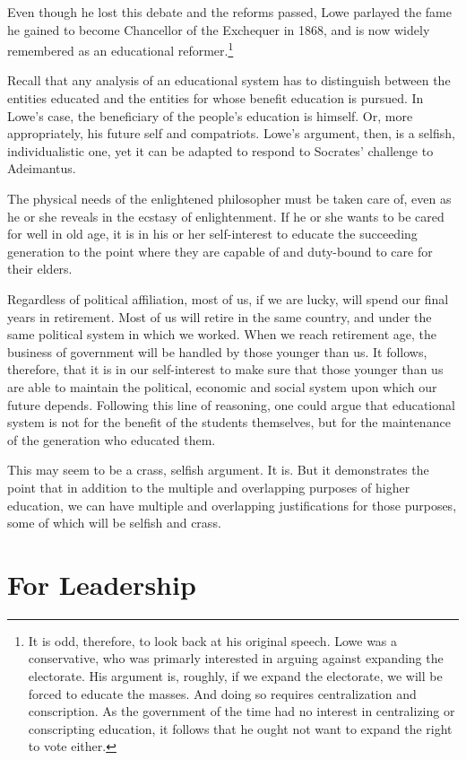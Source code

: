 Even though he lost this debate and the reforms passed, Lowe parlayed the fame he gained to become Chancellor of the Exchequer in 1868, and is now widely remembered as an educational reformer.\footnote{It is odd, therefore, to look back at his original speech. Lowe was a conservative, who was primarly interested in arguing against expanding the electorate. His argument is, roughly, if we expand the electorate, we will be forced to educate the masses. And doing so requires centralization and conscription. As the government of the time had no interest in centralizing or conscripting education, it follows that he ought not want to expand the right to vote either.}

Recall that any analysis of an educational system has to distinguish between the entities educated and the entities for whose benefit education is pursued. In Lowe's case, the beneficiary of the people's education is himself. Or, more appropriately, his future self and compatriots. Lowe's argument, then, is a selfish, individualistic one, yet it can be adapted to respond to Socrates' challenge to Adeimantus.

The physical needs of the enlightened philosopher must be taken care of, even as he or she reveals in the ecstasy of enlightenment. If he or she wants to be cared for well in old age, it is in his or her self-interest to educate the succeeding generation to the point where they are capable of and duty-bound to care for their elders.

Regardless of political affiliation, most of us, if we are lucky, will spend our final years in retirement. Most of us will retire in the same country, and under the same political system in which we worked. When we reach retirement age, the business of government will be handled by those younger than us. It follows, therefore, that it is in our self-interest to make sure that those younger than us are able to maintain the political, economic and social system upon which our future depends. Following this line of reasoning, one could argue that educational system is not for the benefit of the students themselves, but for the maintenance of the generation who educated them.

This may seem to be a crass, selfish argument. It is. But it demonstrates the point that in addition to the multiple and overlapping purposes of higher education, we can have multiple and overlapping justifications for those purposes, some of which will be selfish and crass.

\section{For Leadership}
\label{forleadership}

